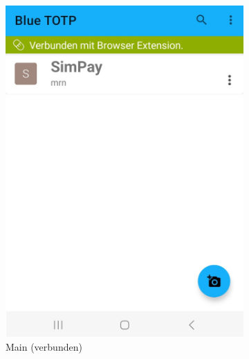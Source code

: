 \begin{figure}[h]
\begin{subfigure}{.23\textwidth}
      \includegraphics[width=.95\linewidth]{figures/impl/screenshot_app_verbunden.jpg}
      \caption{Main (verbunden)}
      \label{fig: blue totp app screenshot verbunden}
    \end{subfigure}
    \begin{subfigure}{.23\textwidth}
        \centering

\end{subfigure}
\end{figure}
